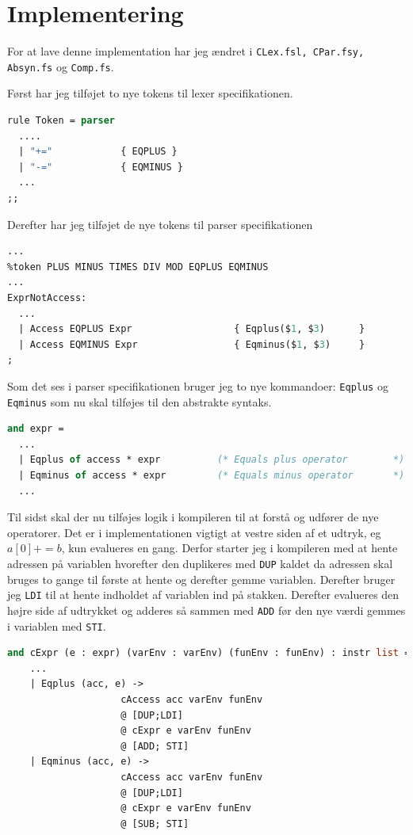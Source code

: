\documentclass[danish,a4paper]{report}
\begin{document}
\section*{Implementering}

For at lave denne implementation har jeg ændret i \texttt{CLex.fsl, CPar.fsy, Absyn.fs} og \texttt{Comp.fs}.

Først har jeg tilføjet to nye tokens til lexer specifikationen.

\begin{lstlisting}[language=ML]
rule Token = parser
  ....
  | "+="            { EQPLUS }
  | "-="            { EQMINUS }
  ...
;;
\end{lstlisting}

Derefter har jeg tilføjet de nye tokens til parser specifikationen

\begin{lstlisting}[language=ML]
...
%token PLUS MINUS TIMES DIV MOD EQPLUS EQMINUS
...
ExprNotAccess:
  ...
  | Access EQPLUS Expr                  { Eqplus($1, $3)      }
  | Access EQMINUS Expr                 { Eqminus($1, $3)     }
;
\end{lstlisting}

Som det ses i parser specifikationen bruger jeg to nye kommandoer: \texttt{Eqplus} og \texttt{Eqminus} som nu skal tilføjes til den abstrakte syntaks.

\begin{lstlisting}[language=ML]
and expr =                                                         
  ...
  | Eqplus of access * expr          (* Equals plus operator        *)
  | Eqminus of access * expr         (* Equals minus operator       *)
  ...
\end{lstlisting}

Til sidst skal der nu tilføjes logik i kompileren til at forstå og udfører de nye operatorer. Det er i implementationen vigtigt at vestre siden af et udtryk, eg $a[0] += b$, kun evalueres en gang. Derfor starter jeg i kompileren med at hente adressen på variablen hvorefter den duplikeres med \texttt{DUP} kaldet da adressen skal bruges to gange til første at hente og derefter gemme variablen. Derefter bruger jeg \texttt{LDI} til at hente indholdet af variablen ind på stakken. Derefter evalueres den højre side af udtrykket og adderes så sammen med \texttt{ADD} før den nye værdi gemmes i variablen med \texttt{STI}.

\begin{lstlisting}[language=ML]
and cExpr (e : expr) (varEnv : varEnv) (funEnv : funEnv) : instr list = 
    ...
    | Eqplus (acc, e) ->  
                    cAccess acc varEnv funEnv 
                    @ [DUP;LDI] 
                    @ cExpr e varEnv funEnv 
                    @ [ADD; STI]  
    | Eqminus (acc, e) -> 
                    cAccess acc varEnv funEnv 
                    @ [DUP;LDI] 
                    @ cExpr e varEnv funEnv 
                    @ [SUB; STI] 
\end{lstlisting}
\end{document}
